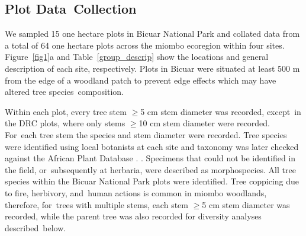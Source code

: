 \documentclass[diversity,article,accept,moreauthors,pdftex]{Definitions/mdpi}
\newcommand{\nplots}{64}
\newcommand{\nplotsbicuar}{15}
\begin{document}

\subsection{Plot Data~Collection}

We sampled \nplotsbicuar{} one hectare plots in Bicuar National Park and collated data from a total of \nplots{} one hectare plots across the miombo ecoregion within four sites. Figure~\ref{fig1}a and Table~\ref{group_descrip} show the locations and general description of each site, respectively. Plots in Bicuar were situated at least 500 m from the edge of a woodland patch to prevent edge effects which may have altered tree species~composition.

Within each plot, every tree stem $\ge$5 cm stem diameter was recorded, except~in the DRC plots, where only stems $\ge$10 cm stem diameter were recorded. For~each tree stem the species and stem diameter were recorded. Tree species were identified using local botanists at each site and taxonomy was later checked against the African Plant Database \citep{APD2020}. . Specimens that could not be identified in the field, or~subsequently at herbaria, were described as morphospecies. All tree species within the Bicuar National Park plots were identified. Tree coppicing due to fire, herbivory, and~human actions is common in miombo woodlands, therefore, for~trees with multiple stems, each stem $\ge$5 cm stem diameter was recorded, while the parent tree was also recorded for diversity analyses described~below.   
\end{document}
